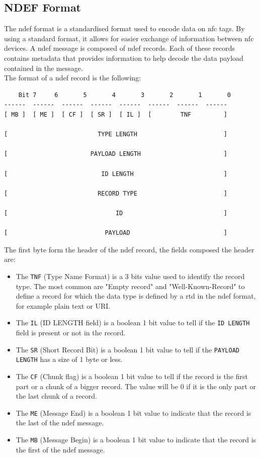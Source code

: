 \documentclass[twoside, openright,11pt,a4paper]{book}
\begin{document}
\subsection{NDEF Format}
The \gls{ndef} format is a standardised format used to encode data on \gls{nfc} tags. By using a standard format, it allows for easier exchange of information between \gls{nfc} devices. A \gls{ndef} message is composed of \gls{ndef} records. Each of these records contains metadata that provides information to help decode the data payload contained in the message.\\

The format of a \gls{ndef} record is the following\cite{nfc:ndef:adafruit:article}:
\begin{verbatim}
	Bit 7     6       5       4       3       2       1       0
------  ------  ------  ------  ------  ------  ------  ------ 
[ MB ]  [ ME ]  [ CF ]  [ SR ]  [ IL ]  [        TNF         ]  

[                         TYPE LENGTH                        ]

[                       PAYLOAD LENGTH                       ]

[                          ID LENGTH                         ]

[                         RECORD TYPE                        ]

[                              ID                            ]

[                           PAYLOAD                          ]
\end{verbatim}
The first byte form the header of the \gls{ndef} record, the fields composed the header are:
\begin{itemize}
	\item The \verb+TNF+ (Type Name Format) is a 3 bits value used to identify the record type. The most common are "Empty record" and "Well-Known-Record" to define a record for which the data type is defined by a \gls{rtd} in the \gls{ndef} format, for example plain text or URI.
	\item The \verb+IL+ (ID LENGTH field) is a boolean 1 bit value to tell if the \verb+ID LENGTH+ field is present or not in the record.
	\item The \verb+SR+ (Short Record Bit) is a boolean 1 bit value to tell if the \verb+PAYLOAD LENGTH+ has a size of 1 byte or less.
	\item The \verb+CF+ (Chunk flag) is a boolean 1 bit value to tell if the record is the first part or a chunk of a bigger record. The value will be 0 if it is the only part or the last chunk of a record.
	\item The \verb+ME+ (Message End) is a boolean 1 bit value to indicate that the record is the last of the \gls{ndef} message.
	\item The \verb+MB+ (Message Begin) is a boolean 1 bit value to indicate that the record is the first of the \gls{ndef} message.
\end{itemize}
\end{document}
